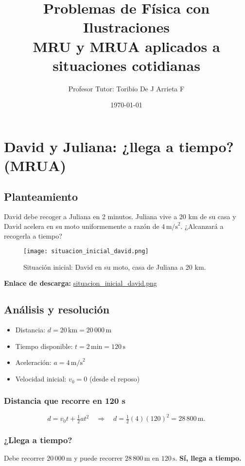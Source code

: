 \documentclass[14pt,letterpaper]{extarticle} %
\title{\Huge Problemas de Física con Ilustraciones\\[2mm]
\Large MRU y MRUA aplicados a situaciones cotidianas}
\author{\Large Profesor Tutor: Toribio De J Arrieta F}
\date{\today}
\begin{document}
\maketitle

\tableofcontents
\listoffigures
\bigskip

\section{David y Juliana: ¿llega a tiempo? (MRUA)}

\subsection{Planteamiento}
David debe recoger a Juliana en 2 minutos. Juliana vive a 20 km de su casa y David acelera en su moto uniformemente a razón de \(4\,\text{m/s}^2\). ¿Alcanzará a recogerla a tiempo?

\begin{figure}[h!]
  \centering
  \texttt{[image: situacion\_inicial\_david.png]}
  \caption{Situación inicial: David en su moto, casa de Juliana a 20 km.}
\end{figure}
\noindent\textbf{Enlace de descarga:} \href{run:imagenes/situacion_inicial_david.png}{situacion\_inicial\_david.png}

\subsection{Análisis y resolución}
\begin{itemize}[leftmargin=1.3cm]
  \item Distancia: \(d=20\,\text{km}=20\,000\,\text{m}\)
  \item Tiempo disponible: \(t=2\,\text{min}=120\,\text{s}\)
  \item Aceleración: \(a=4\,\text{m/s}^2\)
  \item Velocidad inicial: \(v_0=0\) (desde el reposo)
\end{itemize}

\subsubsection*{Distancia que recorre en 120 s}
\[
d = v_0 t + \tfrac{1}{2} a t^2
\quad\Rightarrow\quad
d = \tfrac{1}{2}(4)(120)^2 = 28\,800\,\text{m}.
\]

\subsubsection*{¿Llega a tiempo?}
Debe recorrer \(20\,000\,\text{m}\) y puede recorrer \(28\,800\,\text{m}\) en \(120\,\text{s}\).
\textbf{Sí, llega a tiempo.}
\end{document}
